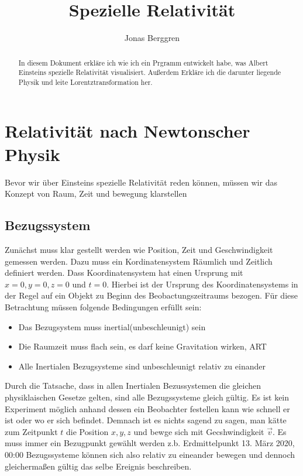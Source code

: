 \documentclass[12pt]{article}
\author{{\Huge Jonas Berggren}}
\title{{\myfont Spezielle Relativität}}
\begin{document}
\maketitle
\tableofcontents
\newpage
\begin{abstract}
In diesem Dokument erkläre ich wie ich ein Prgramm entwickelt habe, was Albert Einsteins spezielle Relativität visualisiert.
Außerdem Erkläre ich die darunter liegende Physik und leite Lorentztransformation her.
\end{abstract}
\section{Relativität nach Newtonscher Physik}
Bevor wir über Einsteins spezielle Relativität reden können, müssen wir das Konzept von Raum, Zeit und bewegung klarstellen
\subsection{Bezugssystem}
Zunächst muss klar gestellt werden wie Position, Zeit und Geschwindigkeit gemessen werden.
Dazu muss ein Kordinatensystem Räumlich und Zeitlich definiert werden.
Dass Koordinatensystem hat einen Ursprung  mit $x = 0, y =0, z = 0$ und $t = 0$.
Hierbei ist der Ursprung des Koordinatensystems in der Regel auf ein Objekt zu Beginn des Beobactungszeitraums bezogen.
Für diese Betrachtung müssen folgende Bedingungen erfüllt sein:
\begin{itemize}
\item Das Bezugsystem muss inertial(unbeschleunigt) sein
\item Die Raumzeit muss flach sein, es darf keine Gravitation wirken, ART
\item Alle Inertialen Bezugsysteme sind unbeschleunigt relativ zu einander
\end{itemize}
Durch die Tatsache, dass in allen Inertialen Bezussystemen die gleichen physiklaischen Gesetze gelten, sind alle Bezugssysteme gleich gültig.
Es ist kein Experiment möglich anhand dessen ein Beobachter festellen kann wie schnell er ist oder wo er sich befindet.
Demnach ist es nichts sagend zu sagen, man kätte zum Zeitpunkt $t$ die Position $x, y, z$ und bewge sich mit Gecshwindigkeit $\vec{v}$.
Es muss immer ein Bezugpunkt gewählt werden z.b. Erdmittelpunkt 13. März 2020, 00:00%
Bezugssysteme können sich also relativ zu eineander bewegen und dennoch gleichermaßen gültig das selbe Ereignis beschreiben.
\end{document}
